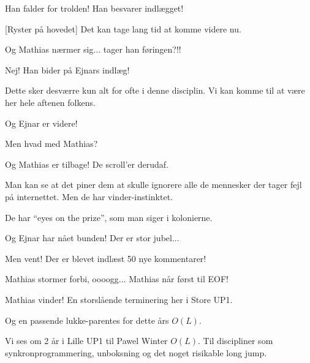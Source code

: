 \documentclass[a4paper,11pt]{article}
\begin{document}
\begin{sketch}
   Han falder for trolden! Han besvarer indlægget!


  [Ryster på hovedet] Det kan tage lang tid at komme videre nu.


    Og Mathias nærmer sig... tager han føringen?!!


    Nej! Han bider på Ejnars indlæg!




     Dette sker desværre kun alt for ofte i denne disciplin. Vi kan
   komme til at være her hele aftenen folkens.


    Og Ejnar er videre!

    Men hvad med Mathias?


    Og Mathias er tilbage! De scroll'er derudaf.

    Man kan se at det piner dem at skulle ignorere alle de mennesker
   der tager fejl på internettet. Men de har vinder-instinktet.

    De har "`eyes on the prize"', som man siger i kolonierne.


    Og Ejnar har nået bunden! Der er stor jubel...

    Men vent! Der er blevet indlæst 50 nye kommentarer!

    Mathias stormer forbi, oooogg... Mathias når først til EOF!

    Mathias vinder! En storslående terminering her i Store UP1.

    Og en passende lukke-parentes for dette års $O(L)$.

    Vi ses om 2 år i Lille UP1 til Pawel Winter $O(L)$. Til discipliner
    som synkronprogrammering, unboksning og det noget risikable long jump.


\end{sketch}
\end{document}
